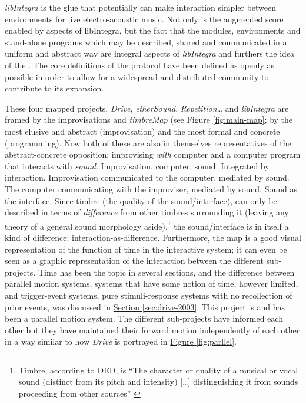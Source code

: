 %
\emph{libIntegra} is the glue that potentially can make interaction simpler between environments for live electro-acoustic music. Not only is the augmented score enabled by aspects of libIntegra, but the fact that the  modules, environments and stand-alone programs which may be described, shared and communicated in a uniform and abstract way are integral aspects of \emph{libIntegra} and furthers the idea of the . The core definitions of the protocol have been defined as openly as possible in order to allow for a widespread and distributed community to contribute to its expansion. 

These four mapped projects, \emph{Drive}, \emph{etherSound}, \emph{Repetition\ldots} and \emph{libIntegra} are framed by the improvisations and \emph{timbreMap} (see Figure \ref{fig:main-map}; by the most elusive and abstract (improvisation) and the most formal and concrete (programming). Now both of these are also in themselves representatives of the abstract-concrete opposition: improvising \emph{with} computer and a computer program that interacts with \emph{sound}. Improvisation, computer, sound. Integrated by interaction. Improvisation communicated to the computer, mediated by sound. The computer communicating with the improviser, mediated by sound. Sound as the interface. Since timbre (the quality of the sound/interface), can only be described in terms of \emph{difference} from other timbres surrounding it (leaving any theory of a general sound morphology aside),\footnote{Timbre, according to OED, is ``The character or quality of a musical or vocal sound (distinct from its pitch and intensity) [\ldots] distinguishing it from sounds proceeding from other sources'' \cite{timbre-oed}} the sound/interface is in itself a kind of difference: interaction-as-difference. Furthermore, the map is a good visual representation of the function of time in the interactive system; it can even be seen as a graphic representation of the interaction between the different sub-projects. Time has been the topic in several sections, and the difference between parallel motion systems, systems that have some notion of time, however limited, and trigger-event systems, pure stimuli-response systems with no recollection of prior events, was discussed in \hyperref[sec:drive-2003]{Section \ref*{sec:drive-2003}}. This project is and has been a parallel motion system. The different sub-projects have informed each other but they have maintained their forward motion independently of each other in a way similar to how \emph{Drive} is portrayed in \hyperref[fig:parllel]{Figure \ref*{fig:parllel}}.

